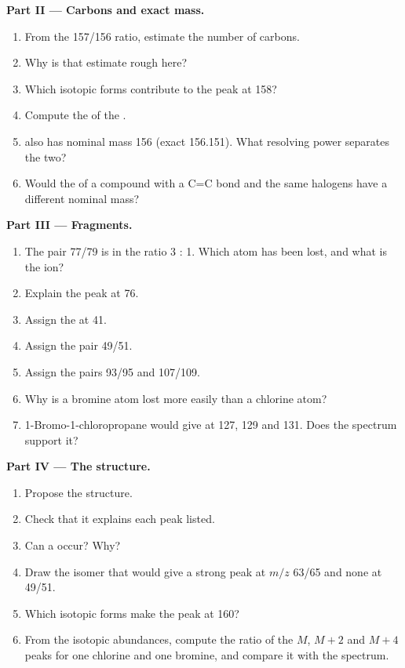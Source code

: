 \begin{problem}
\medskip
\noindent\textbf{Part II --- Carbons and exact mass.}
\begin{enumerate}[resume]
  \item From the 157/156 ratio, estimate the number of carbons.
  \item Why is that estimate rough here?
  \item Which isotopic forms contribute to the peak at 158?
  \item Compute the  of the .
  \item {} also has nominal mass 156 (exact 156.151). What resolving power separates the
        two?
  \item Would the  of a compound with a C=C bond and the same halogens have a different
        nominal mass?
\end{enumerate}

\medskip
\noindent\textbf{Part III --- Fragments.}
\begin{enumerate}[resume]
  \item The pair 77/79 is in the ratio 3 : 1. Which atom has been lost, and what is the ion?
  \item Explain the peak at 76.
  \item Assign the  at 41.
  \item Assign the pair 49/51.
  \item Assign the pairs 93/95 and 107/109.
  \item Why is a bromine atom lost more easily than a chlorine atom?
  \item 1-Bromo-1-chloropropane would give  at 127, 129 and 131. Does the spectrum support
        it?
\end{enumerate}

\medskip
\noindent\textbf{Part IV --- The structure.}
\begin{enumerate}[resume]
  \item Propose the structure.
  \item Check that it explains each peak listed.
  \item Can a  occur? Why?
  \item Draw the isomer that would give a strong peak at $m/z$ 63/65 and none at 49/51.
  \item Which isotopic forms make the peak at 160?
  \item From the isotopic abundances, compute the ratio of the $M$, $M+2$ and $M+4$ peaks for one
        chlorine and one bromine, and compare it with the spectrum.
\end{enumerate}
\end{problem}
